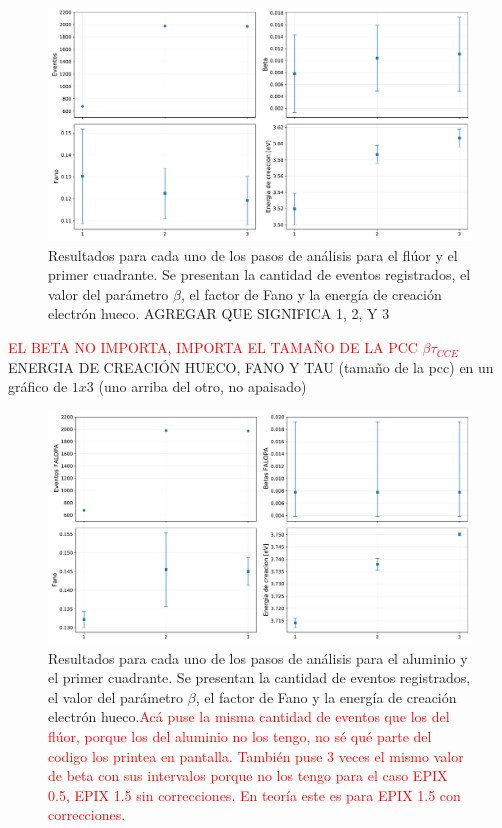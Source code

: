 \begin{figure}[H]
    \centering
        \includegraphics[scale=0.45]{Figs/F_OHDU1_EventosBetaFanoEH.pdf}
    \caption{\footnotesize{Resultados para cada uno de los pasos de análisis para el flúor y el primer cuadrante. Se presentan la cantidad de eventos registrados, el valor del parámetro $\beta$, el factor de Fano y la energía de creación electrón hueco. AGREGAR QUE SIGNIFICA 1, 2, Y 3}}
    \label{fig:F_OHDU1_EventosBetaFanoEH}
\end{figure}
\textcolor{red}{EL BETA NO IMPORTA, IMPORTA EL TAMAÑO DE LA PCC $\beta\tau_{CCE}$}
ENERGIA DE CREACIÓN HUECO, FANO Y TAU (tamaño de la pcc) en un gráfico de $1x3$ (uno arriba del otro, no apaisado)
\begin{figure}[H]
    \centering
        \includegraphics[scale=0.45]{Figs/Al_OHDU1_EventosBetaFanoEH.pdf}
    \caption{\footnotesize{Resultados para cada uno de los pasos de análisis para el aluminio y el primer cuadrante. Se presentan la cantidad de eventos registrados, el valor del parámetro $\beta$, el factor de Fano y la energía de creación electrón hueco.\textcolor{red}{Acá puse la misma cantidad de eventos que los del flúor, porque los del aluminio no los tengo, no sé qué parte del codigo los printea en pantalla. También puse 3 veces el mismo valor de beta con sus intervalos porque no los tengo para el caso EPIX 0.5, EPIX 1.5 sin correcciones. En teoría este es para EPIX 1.5 con correcciones.}}}
    \label{fig:Al_OHDU1_EventosBetaFanoEH}
\end{figure}